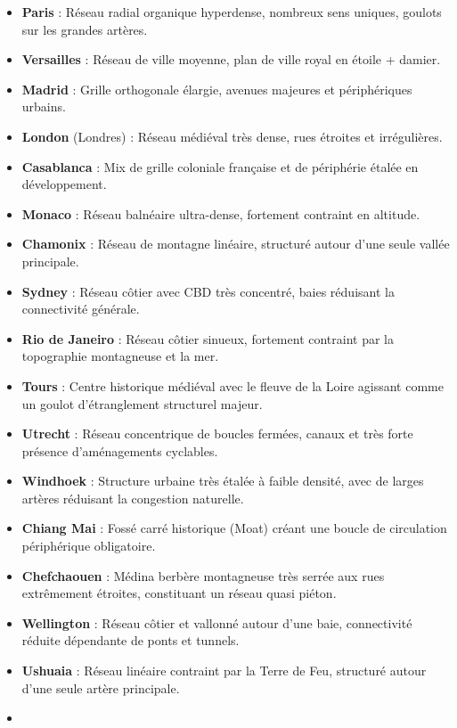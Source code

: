 \documentclass[10pt, a4paper]{article}
\providecommand{\tightlist}{}
\begin{document}
\begin{itemize}
\tightlist
\item
  \textbf{Paris} : Réseau radial organique hyperdense, nombreux sens
  uniques, goulots sur les grandes artères.
\item
  \textbf{Versailles} : Réseau de ville moyenne, plan de ville royal en
  étoile + damier.
\item
  \textbf{Madrid} : Grille orthogonale élargie, avenues majeures et
  périphériques urbains.
\item
  \textbf{London} (Londres) : Réseau médiéval très dense, rues étroites
  et irrégulières.
\item
  \textbf{Casablanca} : Mix de grille coloniale française et de
  périphérie étalée en développement.
\item
  \textbf{Monaco} : Réseau balnéaire ultra-dense, fortement contraint en
  altitude.
\item
  \textbf{Chamonix} : Réseau de montagne linéaire, structuré autour
  d'une seule vallée principale.
\item
  \textbf{Sydney} : Réseau côtier avec CBD très concentré, baies
  réduisant la connectivité générale.
\item
  \textbf{Rio de Janeiro} : Réseau côtier sinueux, fortement contraint
  par la topographie montagneuse et la mer.
\item
  \textbf{Tours} : Centre historique médiéval avec le fleuve de la Loire
  agissant comme un goulot d'étranglement structurel majeur.
\item
  \textbf{Utrecht} : Réseau concentrique de boucles fermées, canaux et
  très forte présence d'aménagements cyclables.
\item
  \textbf{Windhoek} : Structure urbaine très étalée à faible densité,
  avec de larges artères réduisant la congestion naturelle.
\item
  \textbf{Chiang Mai} : Fossé carré historique (Moat) créant une boucle
  de circulation périphérique obligatoire.
\item
  \textbf{Chefchaouen} : Médina berbère montagneuse très serrée aux rues
  extrêmement étroites, constituant un réseau quasi piéton.
\item
  \textbf{Wellington} : Réseau côtier et vallonné autour d'une baie,
  connectivité réduite dépendante de ponts et tunnels.
\item
  \textbf{Ushuaia} : Réseau linéaire contraint par la Terre de Feu,
  structuré autour d'une seule artère principale.
\item

\end{itemize}
\end{document}
